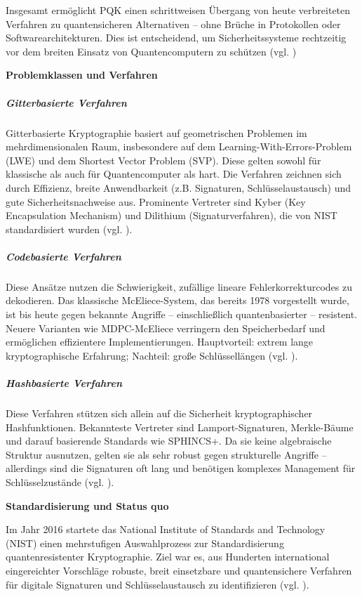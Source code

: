 Insgesamt ermöglicht PQK einen schrittweisen Übergang von heute verbreiteten Verfahren zu quantensicheren Alternativen – ohne Brüche in Protokollen oder Softwarearchitekturen. Dies ist entscheidend, um Sicherheitssysteme rechtzeitig vor dem breiten Einsatz von Quantencomputern zu schützen (vgl. \cite{chen_l_et_al_report_2016, bernstein_et_al_post-quantum_2009})

\vspace{1em}
\textbf{Problemklassen und Verfahren}
\subparagraph{Gitterbasierte Verfahren}
Gitterbasierte Kryptographie basiert auf geometrischen Problemen im mehrdimensionalen Raum, insbesondere auf dem Learning-With-Errors-Problem (LWE) und dem Shortest Vector Problem (SVP). Diese gelten sowohl für klassische als auch für Quantencomputer als hart. Die Verfahren zeichnen sich durch Effizienz, breite Anwendbarkeit (z.B. Signaturen, Schlüsselaustausch) und gute Sicherheitsnachweise aus. Prominente Vertreter sind Kyber (Key Encapsulation Mechanism) und Dilithium (Signaturverfahren), die von NIST standardisiert wurden (vgl. \cite{regev_o_lattices_2005, alagic_g_et_al_status_2023, nist_fips_2024}).
 
\subparagraph{Codebasierte Verfahren}
Diese Ansätze nutzen die Schwierigkeit, zufällige lineare Fehlerkorrekturcodes zu dekodieren. Das klassische McEliece-System, das bereits 1978 vorgestellt wurde, ist bis heute gegen bekannte Angriffe – einschließlich quantenbasierter – resistent. Neuere Varianten wie MDPC-McEliece verringern den Speicherbedarf und ermöglichen effizientere Implementierungen. Hauptvorteil: extrem lange kryptographische Erfahrung; Nachteil: große Schlüssellängen (vgl. \cite{misoczki_r_et_al_mdpc-mceliece_2013, bernstein_et_al_post-quantum_2009}).
 
\subparagraph{Hashbasierte Verfahren}
Diese Verfahren stützen sich allein auf die Sicherheit kryptographischer Hashfunktionen. Bekannteste Vertreter sind Lamport-Signaturen, Merkle-Bäume und darauf basierende Standards wie SPHINCS+. Da sie keine algebraische Struktur ausnutzen, gelten sie als sehr robust gegen strukturelle Angriffe – allerdings sind die Signaturen oft lang und benötigen komplexes Management für Schlüsselzustände (vgl. \cite{lamport_l_constructing_1979, bernstein_et_al_post-quantum_2009, chen_l_et_al_report_2016}).


\vspace{1em}
\textbf{Standardisierung und Status quo}


Im Jahr 2016 startete das National Institute of Standards and Technology (NIST) einen mehrstufigen Auswahlprozess zur Standardisierung quantenresistenter Kryptographie. Ziel war es, aus Hunderten international eingereichter Vorschläge robuste, breit einsetzbare und quantensichere Verfahren für digitale Signaturen und Schlüsselaustausch zu identifizieren (vgl. \cite{alagic_g_et_al_status_2023}).


